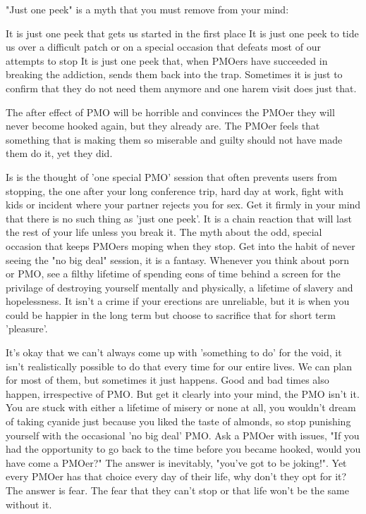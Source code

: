 \documentclass[easypeasy.tex]{subfiles}
\begin{document}
"Just one peek" is a myth that you must remove from your mind:

  It is just one peek that gets us started in the first place
  It is just one peek to tide us over a difficult patch or on a special occasion that defeats most of our attempts to stop
  It is just one peek that, when PMOers have succeeded in breaking the addiction, sends them back into the trap. Sometimes it is just to confirm that they do not need them anymore and one harem visit does just that.

The after effect of PMO will be horrible and convinces the PMOer they will never become hooked again, but they already are. The PMOer feels that something that is making them so miserable and guilty should not have made them do it, yet they did.

Is is the thought of 'one special PMO' session that often prevents users from stopping, the one after your long conference trip, hard day at work, fight with kids or incident where your partner rejects you for sex. Get it firmly in your mind that there is no such thing as 'just one peek'. It is a chain reaction that will last the rest of your life unless you break it. The myth about the odd, special occasion that keeps PMOers moping when they stop. Get into the habit of never seeing the "no big deal" session, it is a fantasy. Whenever you think about porn or PMO, see a filthy lifetime of spending eons of time behind a screen for the privilage of destroying yourself mentally and physically, a lifetime of slavery and hopelessness. It isn't a crime if your erections are unreliable, but it is when you could be happier in the long term but choose to sacrifice that for short term 'pleasure'.

It's okay that we can't always come up with 'something to do' for the void, it isn't realistically possible to do that every time for our entire lives. We can plan for most of them, but sometimes it just happens. Good and bad times also happen, irrespective of PMO. But get it clearly into your mind, the PMO isn't it. You are stuck with either a lifetime of misery or none at all, you wouldn't dream of taking cyanide just because you liked the taste of almonds, so stop punishing yourself with the occasional 'no big deal' PMO. Ask a PMOer with issues, "If you had the opportunity to go back to the time before you became hooked, would you have come a PMOer?" The answer is inevitably, "you've got to be joking!". Yet every PMOer has that choice every day of their life, why don't they opt for it? The answer is fear. The fear that they can't stop or that life won't be the same without it.
\end{document}
